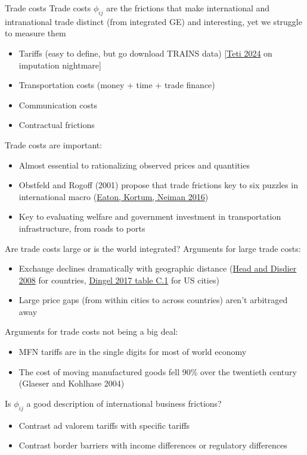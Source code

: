 \documentclass[10pt,notes=hide,aspectratio=169]{beamer}
\begin{document}
\begin{frame}{Trade costs}
Trade costs $\phi_{ij}$ are the frictions that make international and intranational trade distinct (from integrated GE) and interesting, yet we struggle to measure them
\begin{itemize}
	\item Tariffs (easy to define, but go download TRAINS data) [\href{https://www.ifo.de/en/cesifo/publications/2024/working-paper/missing-tariffs}{Teti 2024} on imputation nightmare]
	\item Transportation costs (money + time + trade finance)
	\item Communication costs
	\item Contractual frictions
\end{itemize}
Trade costs are important:
\begin{itemize}
	\item Almost essential to rationalizing observed prices and quantities
	\item Obstfeld and Rogoff (2001) propose that trade frictions key to six puzzles in international macro (\href{https://www.sciencedirect.com/science/article/pii/S0165188916301014}{Eaton, Kortum, Neiman 2016})
	\item Key to evaluating welfare and government investment in transportation infrastructure, from roads to ports
\end{itemize}
\end{frame}
\begin{frame}{Are trade costs large or is the world integrated?}
Arguments for large trade costs:
\begin{itemize}
	\item Exchange declines dramatically with geographic distance ({\small \href{https://www.mitpressjournals.org/doi/10.1162/rest.90.1.37}{Head and Disdier 2008} for countries, \href{http://faculty.chicagobooth.edu/jonathan.dingel/research/thedeterminantsofqualityspecialization.pdf}{Dingel 2017 table C.1} for US cities})
	\item Large price gaps (from within cities to across countries) aren't arbitraged away
\end{itemize}
Arguments for trade costs not being a big deal:
\begin{itemize}
	\item MFN tariffs are in the single digits for most of world economy
	\item The cost of moving manufactured goods fell 90\% over the twentieth century (Glaeser and Kohlhase 2004)
\end{itemize}
Is $\phi_{ij}$ a good description of international business frictions?
\begin{itemize}
	\item Contrast ad valorem tariffs with specific tariffs
	\item Contrast border barriers with income differences or regulatory differences
\end{itemize}
\end{frame}
\end{document}
